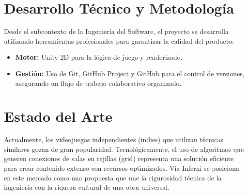 \section{Desarrollo Técnico y Metodología}

Desde el subcontexto de la Ingeniería del Software, el proyecto se desarrolla utilizando herramientas profesionales para garantizar la calidad del producto:
\begin{itemize}
\item \textbf{Motor:} Unity 2D para la lógica de juego y renderizado.
\item \textbf{Gestión:} Uso de Git, GitHub Project y GitHub para el control de versiones, asegurando un flujo de trabajo colaborativo organizado.
\end{itemize}

\section{Estado del Arte}

Actualmente, los videojuegos independientes (indies) que utilizan técnicas similares gozan de gran popularidad. Tecnológicamente, el uso de algoritmos que generen conexiones de salas en rejillas (grid) representa una solución eficiente para crear contenido extenso con recursos optimizados. Via Inferni se posiciona en este mercado como una propuesta que une la rigurosidad técnica de la ingeniería con la riqueza cultural de una obra universal.
